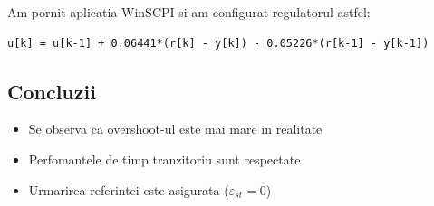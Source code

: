 \documentclass[12pt,english]{article}
\begin{document}
Am pornit aplicatia WinSCPI si am configurat regulatorul astfel:

\begin{lstlisting}
u[k] = u[k-1] + 0.06441*(r[k] - y[k]) - 0.05226*(r[k-1] - y[k-1])
\end{lstlisting}

\begin{figure}[H]
  \centering
\end{figure}

\subsection {Concluzii}
\begin{itemize}
  \item Se observa ca overshoot-ul este mai mare in realitate
  \item Perfomantele de timp tranzitoriu sunt respectate
  \item Urmarirea referintei este asigurata ($\varepsilon _{st} = 0$)
\end{itemize}
\end{document}
